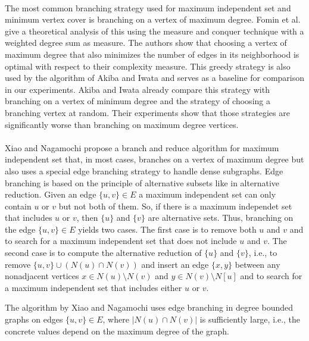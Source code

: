 \documentclass[12pt,a4paper,twoside]{scrartcl}
\numberwithin{equation}{section}
\begin{document}
\paragraph{}
The most common branching strategy used for maximum independent set and minimum vertex cover is branching on a vertex of maximum degree. Fomin et al. \cite{Fomin} give a theoretical analysis of this using the measure and conquer technique with a weighted degree sum as measure. The authors show that choosing a vertex of maximum degree that also minimizes the number of edges in its neighborhood is optimal with respect to their complexity measure. This greedy strategy is also used by the algorithm of Akiba and Iwata \cite{AkibaIwata} and serves as a baseline for comparison in our experiments. Akiba and Iwata already compare this strategy with branching on a vertex of minimum degree and the strategy of choosing a branching vertex at random. Their experiments show that those strategies are significantly worse than branching on maximum degree vertices.

\paragraph{}
Xiao and Nagamochi \cite{XiaoNagamochi} propose a branch and reduce algorithm for maximum independent set that, in most cases, branches on a vertex of maximum degree but also uses a special edge branching strategy to handle dense subgraphs. Edge branching is based on the principle of alternative subsets like in alternative reduction. Given an edge $\{u,v\}\in E$ a maximum independent set can only contain $u$ or $v$ but not both of them. So, if there is a maximum independet set that includes $u$ or $v$, then $\{u\}$ and $\{v\}$ are alternative sets. Thus, branching on the edge $\{u,v\}\in E$ yields two cases. The first case is to remove both $u$ and $v$ and to search for a maximum independent set that does not include $u$ and $v$. The second case is to compute the alternative reduction of $\{u\}$ and $\{v\}$, i.e., to remove $\{u,v\}\cup(N(u)\cap N(v))$ and insert an edge $\{x,y\}$ between any nonadjacent vertices $x\in N(u)\setminus N(v)$ and $y\in N(v)\setminus N[u]$ and to search for a maximum independent set that includes either $u$ or $v$.

The algorithm by Xiao and Nagamochi uses edge branching in degree bounded graphs on edges $\{u,v\}\in E$, where $|N(u)\cap N(v)|$ is sufficiently large, i.e., the concrete values depend on the maximum degree of the graph. 
\end{document}
